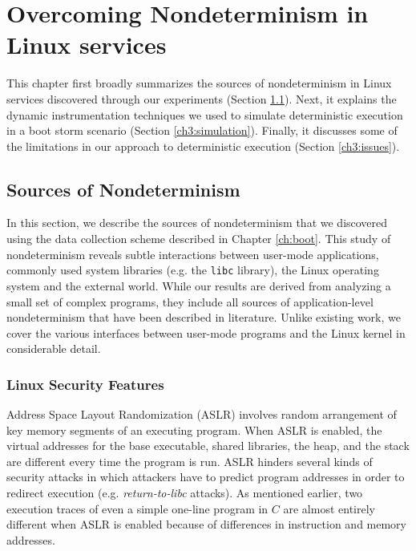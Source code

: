 \newenvironment{mylisting}
{\begin{list}{}{\setlength{\leftmargin}{1em}}\item\scriptsize\bfseries}
{\end{list}}

\chapter{Overcoming Nondeterminism in Linux services}
This chapter first broadly summarizes the sources of nondeterminism
in Linux services discovered through our experiments (Section \ref{ch3:sources}).
Next, it explains the dynamic instrumentation techniques
we used to simulate deterministic execution in a boot
storm scenario (Section \ref{ch3:simulation}).
Finally, it discusses some of the limitations 
in our approach to deterministic execution (Section \ref{ch3:issues}).

\section{Sources of Nondeterminism} \label{ch3:sources}
In this section, we describe the sources of nondeterminism
that we discovered using the data collection scheme
described in Chapter \ref{ch:boot}.
This study of nondeterminism reveals
subtle interactions between user-mode
applications, commonly used system libraries (e.g. the \texttt{libc} library),
the Linux operating system and the external world.
While our results are derived from analyzing a small
set of complex programs, they include
all sources of application-level nondeterminism that 
have been described in literature. Unlike existing work,
we cover the various interfaces between user-mode programs
and the Linux kernel in considerable detail.

\subsection{Linux Security Features} \label{ch3:security}
 \newline
Address Space Layout Randomization (ASLR) involves random arrangement of
key memory segments of an executing program. When ASLR is enabled,
the virtual addresses for the base executable, shared libraries, 
the heap, and the stack are different every time the program is run.
ASLR hinders several kinds of security attacks in which attackers have to predict
program addresses in order to redirect execution (e.g. \emph{return-to-libc} attacks). 
As mentioned earlier, two execution traces of even a
simple one-line program in $C$ are almost entirely different
when ASLR is enabled because of differences in
instruction and memory addresses. \newline

